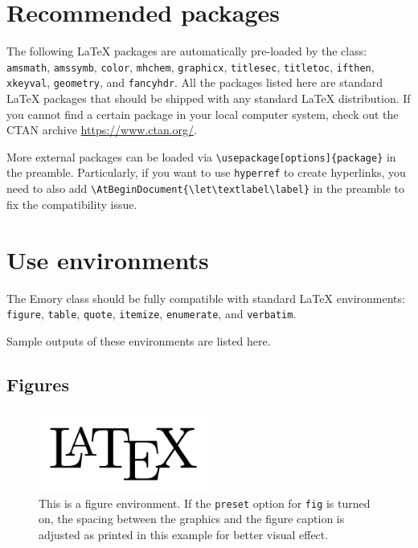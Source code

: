 \documentclass[final]{emory}
\begin{document}
\section{Recommended packages}
The following \LaTeX{} packages are automatically pre-loaded by the class: \Verb|amsmath|, 
\Verb|amssymb|, \Verb|color|, \Verb|mhchem|, \Verb|graphicx|, \Verb|titlesec|, 
\Verb|titletoc|, \Verb|ifthen|, \Verb|xkeyval|, \Verb|geometry|, and 
\Verb|fancyhdr|. All the packages listed here are standard \LaTeX{} packages 
that should be shipped with any standard \LaTeX{} distribution. If you cannot 
find a certain package in your local computer system, check out the CTAN 
archive \url{https://www.ctan.org/}.

More external packages can be loaded via \Verb|\usepackage[options]{package}|
in the preamble. Particularly, if you want to use \Verb|hyperref| to create hyperlinks, 
you need to also add \Verb|\AtBeginDocument{\let\textlabel\label}| in the preamble to fix the compatibility issue. 


\section{Use environments}\label{sec:env}
The Emory class should be fully compatible with standard \LaTeX{} environments:
\Verb|figure|, \Verb|table|, \Verb|quote|, \Verb|itemize|, \Verb|enumerate|,
and \Verb|verbatim|.

Sample outputs of these environments are listed here. 

\subsection{Figures}

\begin{figure}[htp!]
  \centering
  \includegraphics[width=0.5\textwidth]{LaTeXLogo.png}
  \caption[This is a figure environment]{This is a figure 
  environment.\label{fig} If the \protect\Verb|preset| option 
  for \protect\Verb|fig| is turned on, the spacing between the graphics and the 
  figure caption is adjusted as printed in this example for better visual 
  effect.}
\end{figure}
\end{document}
